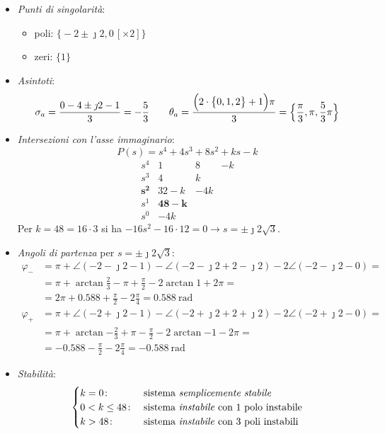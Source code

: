 \begin{esercizio}
\begin{itemize}
	\item \emph{Punti di singolarità}:
		\begin{itemize}
			\item poli: \(\bigl\{ -2\pm\jmath2, 0\,[\times 2] \bigr\}\)
			\item zeri: \(\bigl\{ 1 \bigr\}\)
		\end{itemize}
	\item \emph{Asintoti}:
		\[
			\sigma_a = \frac{0-4\pm\jmath2-1}{3} = -\frac{5}{3} \qquad
			\theta_a = \frac{\Bigl(2\cdot \bigl\{ 0,1,2 \bigr\} +1 \Bigr)\pi}{3} = \Bigl\{ \frac{\pi}{3},\pi,\frac{5}{3}\pi \Bigr\}
		\]
	\item \emph{Intersezioni con l'asse immaginario}:
		\[
			P(s) = s^4 +4s^3 +8s^2 +ks -k
		\]
		\[\begin{array}{r|rrr}
			s^4 	 & 1    &   8 & -k \\
			s^3 	 & 4    &   k 	   \\
			\bm{s^2} & 32-k & -4k 	   \\
			s^1 	 & \bm{48-k} 	   \\
			s^0 	 & -4k
		\end{array}\]
		Per \(k = 48 = 16\cdot3\) si ha \(-16s^2-16\cdot12=0 \rightarrow
		s = \pm\jmath2\sqrt{3}\).
	\item \emph{Angoli di partenza} per \(s = \pm\jmath2\sqrt{3}\):
		\begin{align*}
			\varphi_- &= \pi + \angle(-2-\jmath2-1) -\angle(-2-\jmath2+2-\jmath2) -2\angle(-2-\jmath2-0) = \\
				  &= \pi + \arctan{\frac{2}{3}} -\pi +\frac{\pi}{2} -2\arctan{1} +2\pi = \\
				  &= 2\pi +0.588 +\frac{\pi}{2} -2\frac{\pi}{4} = \SI{0.588}{\radian} \\
			\varphi_+ &= \pi +\angle(-2+\jmath2-1) -\angle(-2+\jmath2+2+\jmath2) -2\angle(-2+\jmath2-0) = \\
				  &= \pi +\arctan{-\frac{2}{3}} +\pi -\frac{\pi}{2} -2\arctan{-1} -2\pi = \\
				  &= -0.588 -\frac{\pi}{2} -2\frac{\pi}{4} = \SI{-0.588}{\radian}
		\end{align*}
	\item \emph{Stabilità}:
		\[\begin{cases}
			k = 0\colon & \text{sistema \emph{semplicemente stabile}} \\
			0 < k \leq 48\colon & \text{sistema \emph{instabile} con 1 polo instabile} \\
			k > 48\colon & \text{sistema \emph{instabile} con 3 poli instabili}
		\end{cases}\]
\end{itemize}


\end{esercizio}
